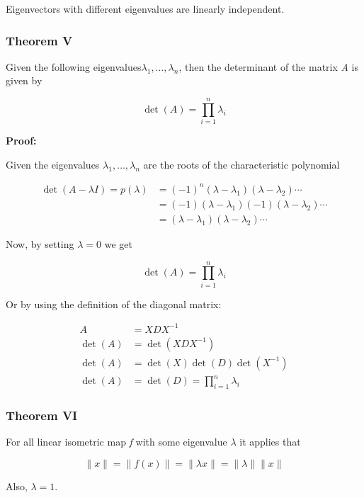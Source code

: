 Eigenvectors with different eigenvalues are linearly independent.

\subsubsection{Theorem V}

Given the following eigenvalues\(\lambda_1, \dots, \lambda_n\), then the 
determinant of the matrix \emph{A} is given by 

\[
    \det(A) = \prod_{i = 1}^{n} \lambda_i
\]

\textbf{Proof:}

Given the eigenvalues \(\lambda_1, \dots, \lambda_n\) are the roots of the characteristic polynomial

\begin{align*}
    \det(A - \lambda I) = p (\lambda) &= (-1)^{n}(\lambda - \lambda_1)(\lambda - \lambda_2)\cdots\\
                                      &= (-1)(\lambda - \lambda_1)(-1)(\lambda - \lambda_2)\cdots\\     
                                      &= (\lambda - \lambda_1)(\lambda - \lambda_2)\cdots                       
\end{align*}

Now, by setting \(\lambda = 0\) we get 

\[
    \det(A) = \prod_{i = 1}^{n} \lambda_i
\]

Or by using the definition of the diagonal matrix:

\begin{align*}
    A &= XDX^{-1} \\
   \det(A) &= \det(XDX^{-1})\\
   \det(A) &= \det(X)\det(D)\det(X^{-1})\\
   \det(A) &= \det(D) = \prod_{i = 1}^{n} \lambda_i
\end{align*}

\QED

\subsubsection{Theorem VI}

For all linear isometric map \emph{f} with some eigenvalue \(\lambda\) it applies that

\[
    \|x\| = \|f(x)\| = \|\lambda x\| = \|\lambda\|\|x\|
\]

Also, \(\lambda = 1\).
\vspace{\baselineskip}

